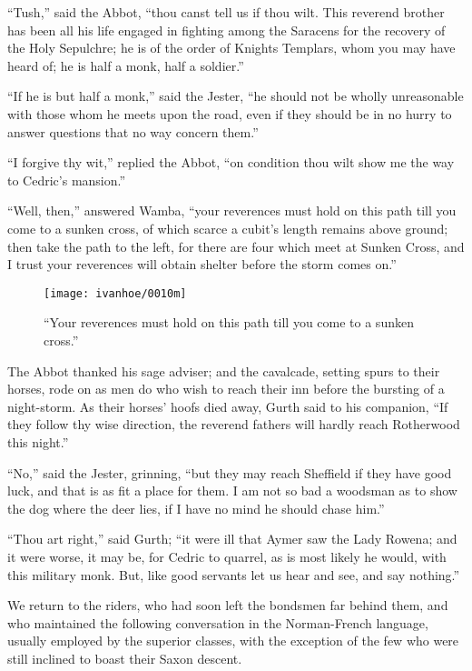 ``Tush,'' said the Abbot, ``thou canst tell us if thou wilt. This
reverend brother has been all his life engaged in fighting among the
Saracens for the recovery of the Holy Sepulchre; he is of the order of
Knights Templars, whom you may have heard of; he is half a monk, half a
soldier.''

``If he is but half a monk,'' said the Jester, ``he should not be wholly
unreasonable with those whom he meets upon the road, even if they should
be in no hurry to answer questions that no way concern them.''

``I forgive thy wit,'' replied the Abbot, ``on condition thou wilt show
me the way to Cedric's mansion.''

``Well, then,'' answered Wamba, ``your reverences must hold on this path
till you come to a sunken cross, of which scarce a cubit's length
remains above ground; then take the path to the left, for there are four
which meet at Sunken Cross, and I trust your reverences will obtain
shelter before the storm comes on.''

\begin{figure}
    \centering
    \texttt{[image: ivanhoe/0010m]}
    \caption{``Your reverences must hold on this path till you come to
    a sunken cross.''}
\end{figure}

The Abbot thanked his sage adviser; and the cavalcade, setting spurs to
their horses, rode on as men do who wish to reach their inn before the
bursting of a night-storm. As their horses' hoofs died away, Gurth said
to his companion, ``If they follow thy wise direction, the reverend
fathers will hardly reach Rotherwood this night.''

``No,'' said the Jester, grinning, ``but they may reach Sheffield if
they have good luck, and that is as fit a place for them. I am not so
bad a woodsman as to show the dog where the deer lies, if I have no mind
he should chase him.''

``Thou art right,'' said Gurth; ``it were ill that Aymer saw the Lady
Rowena; and it were worse, it may be, for Cedric to quarrel, as is most
likely he would, with this military monk. But, like good servants let us
hear and see, and say nothing.''

We return to the riders, who had soon left the bondsmen far behind them,
and who maintained the following conversation in the Norman-French
language, usually employed by the superior classes, with the exception
of the few who were still inclined to boast their Saxon descent.

